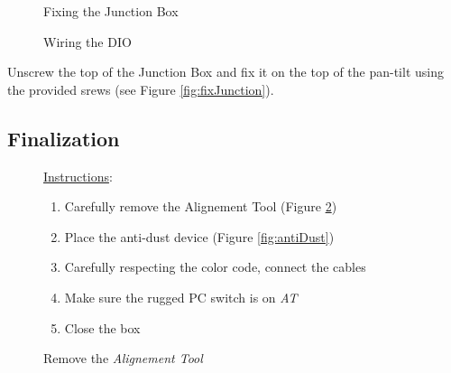 \vspace{20pt}
\begin{figure}[!ht]
  \centering
  \begin{minipage}[b]{0.49\textwidth}
	  \vspace{-10pt}
	  \caption{Fixing the Junction Box}
	\label{fig:fixJunction}
  \end{minipage}
  \hfill
  \begin{minipage}[b]{0.49\textwidth}
	  \vspace{-10pt}
	  \caption{Wiring the DIO}
	\label{fig:DIOwiring}
  \end{minipage}



\end{figure}

\noindent Unscrew the top of the Junction Box and fix it on the top of the pan-tilt
using the provided srews (see Figure \ref{fig:fixJunction}).


\clearpage
\subsection{Finalization}


\begin{figure}[!th]
	\centering
	\begin{minipage}[h]{0.6\textwidth}
		\vspace{-7cm}
		\underline{Instructions}:
		\begin{enumerate}
			\item Carefully remove the Alignement Tool (Figure \ref{fig:alignement})
			\item Place the anti-dust device (Figure \ref{fig:antiDust})
			\item Carefully respecting the color code, connect the cables
			\item Make sure the rugged PC switch is on \textit{AT}
			\item Close the box
		\end{enumerate}
	\end{minipage}
	\begin{minipage}[b]{0.3\textwidth}
		\vspace{-20pt}
		\caption{Remove the \textit{Alignement Tool}}
		\label{fig:alignement}
	\end{minipage}
\end{figure}


